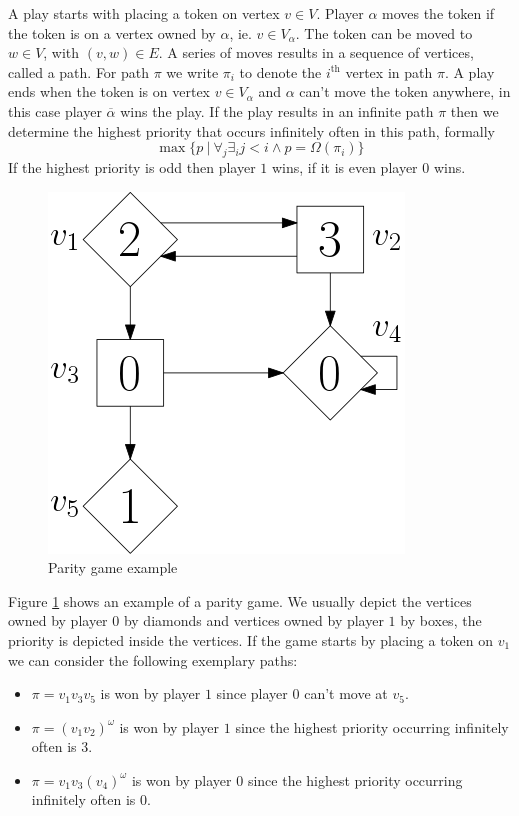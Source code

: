  A play starts with placing a token on vertex $v \in V$. Player $\alpha$ moves the token if the token is on a vertex owned by $\alpha$, ie. $v \in V_\alpha$. The token can be moved to $w \in V$, with $(v,w) \in E$. A series of moves results in a sequence of vertices, called a path. For path $\pi$ we write $\pi_i$ to denote the $i^{\text{th}}$ vertex in path $\pi$. A play ends when the token is on vertex $v \in V_\alpha$ and $\alpha$ can't move the token anywhere, in this case player $\overline{\alpha}$ wins the play. If the play results in an infinite path $\pi$ then we determine the highest priority that occurs infinitely often in this path, formally
\[ \max\{ p \ |\ \forall_j \exists_i j < i \wedge p = \Omega(\pi_i) \}\] 
If the highest priority is odd then player $1$ wins, if it is even player $0$ wins.
\begin{figure}[h]
	\centering
	\includegraphics[scale=0.3]{Examples/SimplePG/PG}
	\caption[Parity game example]{Parity game example}
	\label{fig:simplepgpg}
\end{figure}

Figure \ref{fig:simplepgpg} shows an example of a parity game. We usually depict the vertices owned by player $0$ by diamonds and vertices owned by player $1$ by boxes, the priority is depicted inside the vertices. If the game starts by placing a token on $v_1$ we can consider the following exemplary paths:
\begin{itemize}
	\item $\pi = v_1v_3v_5$ is won by player $1$ since player $0$ can't move at $v_5$.
	\item $\pi = (v_1v_2)^\omega$ is won by player $1$ since the highest priority occurring infinitely often is 3.
	\item $\pi = v_1v_3(v_4)^\omega$ is won by player $0$ since the highest priority occurring infinitely often is $0$.
\end{itemize}


